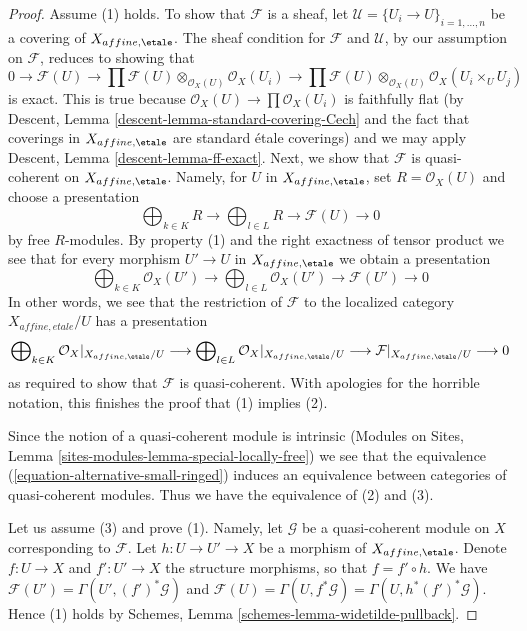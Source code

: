\begin{proof}
Assume (1) holds. To show that $\mathcal{F}$ is a sheaf, let
$\mathcal{U} = \{U_i \to U\}_{i = 1, \ldots, n}$ be a covering
of $X_{affine, \etale}$. The sheaf condition for $\mathcal{F}$
and $\mathcal{U}$, by our assumption on $\mathcal{F}$,
reduces to showing that
$$
0 \to \mathcal{F}(U) \to
\prod \mathcal{F}(U) \otimes_{\mathcal{O}_X(U)} \mathcal{O}_X(U_i) \to
\prod \mathcal{F}(U) \otimes_{\mathcal{O}_X(U)} \mathcal{O}_X(U_i \times_U U_j)
$$
is exact. This is true because $\mathcal{O}_X(U) \to \prod \mathcal{O}_X(U_i)$
is faithfully flat
(by Descent, Lemma \ref{descent-lemma-standard-covering-Cech} and
the fact that coverings in $X_{affine, \etale}$ are standard \'etale
coverings) and we may apply Descent, Lemma \ref{descent-lemma-ff-exact}.
Next, we show that $\mathcal{F}$ is quasi-coherent on $X_{affine, \etale}$.
Namely, for $U$ in $X_{affine, \etale}$, set $R = \mathcal{O}_X(U)$
and choose a presentation
$$
\bigoplus\nolimits_{k \in K} R
\longrightarrow
\bigoplus\nolimits_{l \in L} R
\longrightarrow
\mathcal{F}(U)
\longrightarrow 0
$$
by free $R$-modules. By property (1) and the right exactness of tensor product
we see that for every morphism $U' \to U$ in $X_{affine, \etale}$
we obtain a presentation
$$
\bigoplus\nolimits_{k \in K} \mathcal{O}_X(U')
\longrightarrow
\bigoplus\nolimits_{l \in L} \mathcal{O}_X(U')
\longrightarrow
\mathcal{F}(U')
\longrightarrow 0
$$
In other words, we see that the restriction of $\mathcal{F}$
to the localized category $X_{affine, etale}/U$ has a presentation
$$
\bigoplus\nolimits_{k \in K} \mathcal{O}_X|_{X_{affine, \etale}/U}
\longrightarrow
\bigoplus\nolimits_{l \in L} \mathcal{O}_X|_{X_{affine, \etale}/U}
\longrightarrow
\mathcal{F}|_{X_{affine, \etale}/U}
\longrightarrow 0
$$
as required to show that $\mathcal{F}$ is quasi-coherent.
With apologies for the horrible notation, this finishes the proof
that (1) implies (2).

\medskip\noindent
Since the notion of a quasi-coherent module is intrinsic
(Modules on Sites, Lemma \ref{sites-modules-lemma-special-locally-free})
we see that the equivalence (\ref{equation-alternative-small-ringed})
induces an equivalence between categories of quasi-coherent modules.
Thus we have the equivalence of (2) and (3).

\medskip\noindent
Let us assume (3) and prove (1). Namely, let
$\mathcal{G}$ be a quasi-coherent module on $X$ corresponding to $\mathcal{F}$.
Let $h : U \to U' \to X$ be a morphism of $X_{affine, \etale}$.
Denote $f : U \to X$ and $f' : U' \to X$ the structure morphisms,
so that $f = f' \circ h$. We have
$\mathcal{F}(U') = \Gamma(U', (f')^*\mathcal{G})$ and
$\mathcal{F}(U) = \Gamma(U, f^*\mathcal{G}) = \Gamma(U, h^*(f')^*\mathcal{G})$.
Hence (1) holds by Schemes, Lemma \ref{schemes-lemma-widetilde-pullback}.
\end{proof}





